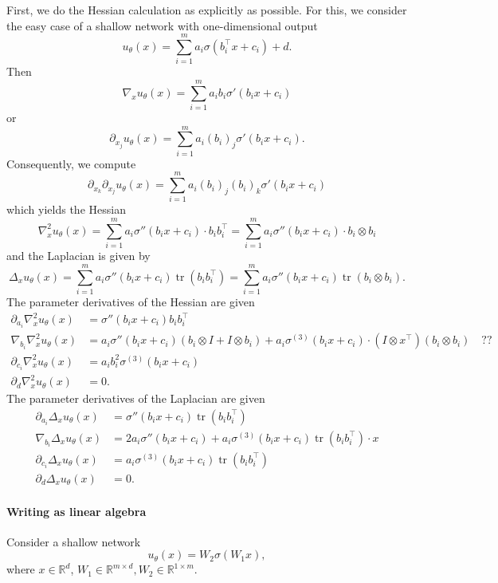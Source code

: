 First, we do the Hessian calculation as explicitly as possible. For this, we consider the easy case of a shallow network with one-dimensional output
\[ u_\theta(x) = \sum_{i=1}^m a_i\sigma(b_i^\top x + c_i) + d. \]
Then
\[ \nabla_x u_\theta(x) = \sum_{i=1}^m a_ib_i\sigma'(b_i x + c_i) \]
or
\[ \partial_{x_j} u_\theta(x) = \sum_{i=1}^m a_i(b_i)_j\sigma'(b_i x + c_i). \]
Consequently, we compute
\[ \partial_{x_k}\partial_{x_j} u_\theta(x) = \sum_{i=1}^m a_i(b_i)_j(b_i)_k\sigma'(b_i x + c_i) \]
which yields the Hessian
\[ \nabla^2_x u_\theta(x) = \sum_{i=1}^m a_i\sigma''(b_i x + c_i) \cdot b_ib_i^\top = \sum_{i=1}^m a_i\sigma''(b_i x + c_i) \cdot  b_i\otimes b_i \]
and the Laplacian is given by
\[ \Delta_x u_\theta(x) = \sum_{i=1}^m a_i\sigma''(b_i x + c_i) \operatorname{tr}(b_ib_i^\top) = \sum_{i=1}^m a_i\sigma''(b_i x + c_i)  \operatorname{tr}(b_i\otimes b_i). \]
The parameter derivatives of the Hessian are given
\begin{align*}
  \partial_{a_i}\nabla_x^2 u_\theta(x) & = \sigma''(b_i x + c_i) b_ib_i^\top \\
  \nabla_{b_i}\nabla_x^2 u_\theta(x) & = a_i\sigma''(b_i x + c_i) (b_i\otimes I+I\otimes b_i) + a_i \sigma^{(3)}(b_i x + c_i) \cdot  (I\otimes x^\top)(b_i\otimes b_i) \quad ?? \\
     \partial_{c_i}\nabla_x^2 u_\theta(x) & = a_i b_i^2\sigma^{(3)}(b_i x + c_i) \\
     \partial_{d}\nabla_x^2 u_\theta(x) & = 0.
\end{align*}
The parameter derivatives of the Laplacian are given
\begin{align*}
     \partial_{a_i}\Delta_x u_\theta(x) & = \sigma''(b_i x + c_i) \operatorname{tr}(b_ib_i^\top) \\
     \nabla_{b_i}\Delta_x u_\theta(x) & = 2a_i\sigma''(b_i x + c_i) + a_i \sigma^{(3)}(b_i x + c_i) \operatorname{tr}(b_ib_i^\top) \cdot x \\
     \partial_{c_i}\Delta_x u_\theta(x) & = a_i \sigma^{(3)}(b_i x + c_i)\operatorname{tr}(b_ib_i^\top) \\
     \partial_{d}\Delta_x u_\theta(x) & = 0.
\end{align*}


\paragraph{Writing as linear algebra}

Consider a shallow network
\[ u_\theta(x) = W_2\sigma(W_1 x), \]
where $x\in\mathbb R^d$, $W_1\in\mathbb R^{m\times d}, W_2\in\mathbb R^{1\times m}$.

